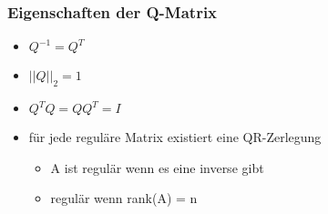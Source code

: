 \subsubsection*{Eigenschaften der Q-Matrix}
\begin{itemize}

	\item $Q^{-1} = Q^T$
	
	\item $||Q||_2 = 1$
	
	\item $Q^TQ = QQ^T = I$
	
	\item für jede reguläre Matrix existiert eine QR-Zerlegung
	\begin{itemize}
	
		\item A ist regulär wenn es eine inverse gibt
		
		\item regulär wenn rank(A) = n	
	
	\end{itemize}
	
\end{itemize}


